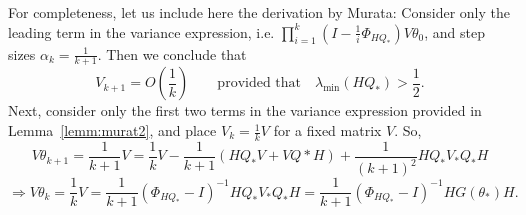 \documentclass[12pt]{article}
\begin{document}
 \bigskip

\noindent
For completeness, let us include here the derivation by Murata\cite{murata:1998}:
Consider only the leading term in the variance expression, i.e. $\prod_{i=1}^k(I-\frac{1}{i} \Phi_{H Q_\ast})V\theta_0$, and step sizes $\alpha_k=\frac{1}{k+1}$.  Then we conclude that 
\[
 V_{k+1} = O(\frac{1}{k}) \qquad \mbox{provided that} \quad \lambda_{\min}(HQ_\ast) > \frac{1}{2}.
\]
Next, consider only the first two terms in the variance expression provided in Lemma~\ref{lemm:murat2}, and place $V_k = \frac{1}{k}V$ for a fixed matrix $V$.  So,
\[
V\theta_{k+1} =  \frac{1}{k+1}V = \frac{1}{k}V - \frac{1}{k+1}(HQ_\ast V+VQ\ast H) + \frac{1}{(k+1)^2}HQ_\ast V_\ast Q_\ast H 
\]
\[
 \Rightarrow V\theta_k = \frac{1}{k} V = \frac{1}{k+1} (\Phi_{HQ_\ast}-I)^{-1}HQ_\ast V_\ast Q_\ast H = \frac{1}{k+1}(\Phi_{HQ_\ast}-I)^{-1}H G(\theta_\ast)H.  
\]

  
\end{document}
